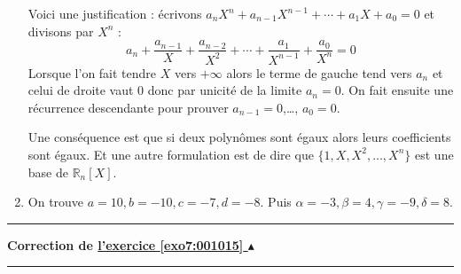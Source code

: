 \documentclass[11pt,a4paper]{article}
\newcommand{\Rr}{\mathbb{R}} \newcommand{\R}{\mathbb{R}}
\newcounter{exo}
\newcommand{\correction}[1]{\hypertarget{cor7:#1}{}\label{cor7:#1}{\bf Correction de \hyperlink{exo7:#1}{l'exercice \ref{exo7:#1} $\blacktriangle$}}\vspace{1mm}\hrule\vspace{1mm}}
\newcommand{\fincorrection}{\vspace{1mm}\hrule\vspace*{7mm}}
\begin{document}
\begin{enumerate}
Voici une justification : écrivons $a_nX^n+ a_{n-1}X^{n-1}+\cdots+a_1X+a_0=0$
et divisons par $X^n$ :
$$a_n + \frac {a_{n-1}}{X} + \frac{a_{n-2}}{X^2} + \cdots + \frac{a_1}{X^{n-1}} + \frac{a_0}{X^n} = 0$$
Lorsque l'on fait tendre $X$ vers $+\infty$ alors le terme de gauche tend vers $a_n$ et celui de droite vaut $0$ donc 
par unicité de la limite $a_n=0$.
On fait ensuite une récurrence descendante pour prouver $a_{n-1}=0$,\ldots, $a_0=0$.

Une conséquence est que si deux polynômes sont égaux alors leurs coefficients sont égaux.
Et une autre formulation est de dire que $\{1,X,X^2,\ldots,X^n\}$ est une base de $\Rr_n[X]$.

  \item On trouve $a=10, b= -10, c = -7, d= -8$.
Puis $\alpha=-3,\beta=4,\gamma=-9,\delta=8$.
\end{enumerate}
\fincorrection
\correction{001015}
\end{document}
